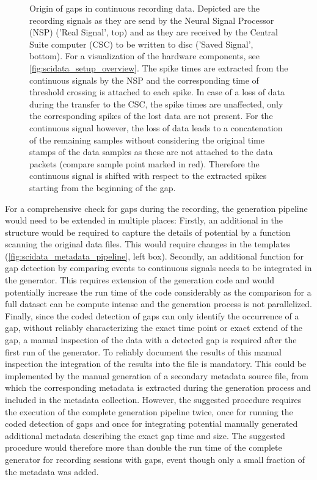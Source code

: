 \begin{figure}[htbp]
 \centering
 
 \caption[Origin of gaps in continuous recording data]{Origin of gaps in continuous recording data. Depicted are the recording signals as they are send by the Neural Signal Processor (NSP) ('Real Signal', top) and as they are received by the Central Suite computer (CSC) to be written to disc ('Saved Signal', bottom). For a visualization of the hardware components, see \cref{fig:scidata_setup_overview}. The spike times are extracted from the continuous signals by the NSP and the corresponding time of threshold crossing is attached to each spike. In case of a loss of data during the transfer to the CSC, the spike times are unaffected, only the corresponding spikes of the lost data are not present. For the continuous signal however, the loss of data leads to a concatenation of the remaining samples without considering the original time stamps of the data samples as these are not attached to the data packets (compare sample point marked in red). Therefore the continuous signal is shifted with respect to the extracted spikes starting from the beginning of the gap.}
 \label{fig:scidata_gaps}
\end{figure}

For a comprehensive check for gaps during the recording, the  generation pipeline would need to be extended in multiple places: Firstly, an additional  in the  structure would be required to capture the details of potential by a function scanning the original data files. This would require changes in the  templates (\cref{fig:scidata_metadata_pipeline}, left box). Secondly, an additional function for gap detection by comparing events to continuous signals needs to be integrated in the  generator. This requires extension of the  generation code and would potentially increase the run time of the code considerably as the comparison for a full dataset can be compute intense and the  generation process is not parallelized. Finally, since the coded detection of gaps can only identify the occurrence of a gap, without reliably characterizing the exact time point or exact extend of the gap, a manual inspection of the data with a detected gap is required after the first run of the  generator. To reliably document the results of this manual inspection the integration of the results into the  file is mandatory. This could be implemented by the manual generation of a secondary metadata source file, from which the corresponding metadata is extracted during the  generation process and included in the metadata collection. However, the suggested procedure requires the execution of the complete  generation pipeline twice, once for running the coded detection of gaps and once for integrating potential manually generated additional metadata describing the exact gap time and size. The suggested procedure would therefore more than double the run time of the complete  generator for recording sessions with gaps, event though only a small fraction of the metadata was added.


